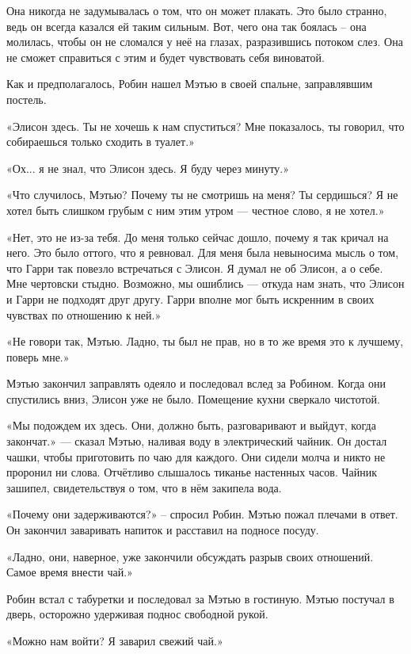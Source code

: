 \documentclass[a5paper, 9pt,
final, openany, twoside=true]{memoir}
\begin{document}
Она никогда не задумывалась о том, что он может плакать. Это было странно, ведь он всегда казался ей таким сильным. Вот, чего она так боялась – она молилась, чтобы он не сломался у неё на глазах,  разразившись потоком слез. Она не сможет справиться с этим и будет чувствовать себя виноватой.

Как и предполагалось, Робин нашел Мэтью в своей спальне, заправлявшим постель.

«Элисон здесь. Ты не хочешь к нам спуститься? Мне показалось, ты говорил, что собираешься только сходить в туалет.»

«Ох... я не знал, что Элисон здесь. Я буду через минуту.»

«Что случилось, Мэтью? Почему ты не смотришь на меня? Ты сердишься? Я не хотел быть слишком грубым с ним этим утром — честное слово, я не хотел.»

«Нет, это не из-за тебя. До меня только сейчас дошло, почему я так кричал на него. Это было оттого, что я ревновал. Для меня была невыносима мысль о том, что Гарри так повезло встречаться с Элисон. Я думал не об Элисон, а о себе. Мне чертовски стыдно. Возможно, мы ошиблись — откуда нам знать, что Элисон и Гарри не подходят друг другу. Гарри вполне мог быть искренним в своих чувствах по отношению к ней.»

«Не говори так, Мэтью. Ладно, ты был не прав, но в то же время это к лучшему, поверь мне.»\bigskip

Мэтью закончил заправлять одеяло и последовал вслед за Робином. Когда они спустились вниз, Элисон уже не было. Помещение кухни сверкало чистотой.

«Мы подождем их здесь. Они, должно быть, разговаривают и выйдут, когда закончат.» — сказал Мэтью, наливая воду в электрический чайник. Он достал чашки, чтобы приготовить по чаю для каждого. Они сидели молча и никто не проронил ни слова. Отчётливо слышалось тиканье настенных часов. Чайник зашипел, свидетельствуя о том, что в нём закипела вода.

«Почему они задерживаются?» – спросил Робин. Мэтью пожал плечами в ответ. Он закончил заваривать напиток и расставил на подносе посуду.

«Ладно, они, наверное, уже закончили обсуждать разрыв своих отношений. Самое время внести чай.»

Робин встал с табуретки и последовал за Мэтью в гостиную. Мэтью постучал в дверь, осторожно удерживая поднос свободной рукой.

«Можно нам войти? Я заварил свежий чай.»
\end{document}
